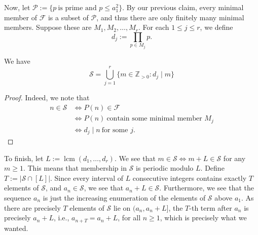 \documentclass[11pt]{article}
\begin{document}
Now, let $\mathcal{P} := \{ p \ \text{is prime and } p \le a_1^2 \}$. By our previous claim, every minimal member of $\mathcal{F}$ is a subset of $\mathcal{P}$, and thus there are only finitely many minimal members. Suppose these are $M_1, M_2, \dots, M_r$. For each $1 \le j \le r$, we define
\[ d_j := \prod_{p \in M_j} p. \]
\begin{claim}
    We have
\[ \mathcal{S} = \bigcup_{j= 1}^r \{ m \in \mathbb{Z}_{>0} : d_j \mid m \} \]
\end{claim}
\begin{proof}
    Indeed, we note that
\begin{align*}
n \in \mathcal{S} &\iff P(n) \in \mathcal{F} \\ 
&\iff P(n) \ \text{contain some minimal member } M_j \\ 
&\iff d_j \mid n \ \text{for some } j.
\end{align*}
\end{proof}

To finish, let $L := \operatorname{lcm}(d_1, \dots, d_r)$. We see that $m \in \mathcal{S} \iff m + L \in \mathcal{S}$ for any $m \ge 1$. This means that membership in $\mathcal{S}$ is periodic modulo $L$. Define $T := |\mathcal{S} \cap [L]|$. Since every interval of $L$ consecutive integers contains exactly $T$ elements of $\mathcal{S}$, and $a_n \in \mathcal{S}$, we see that $a_n + L \in \mathcal{S}$. Furthermore, we see that the sequence $a_n$ is just the increasing enumeration of the elements of $\mathcal{S}$ above $a_1$. As there are precisely $T$ elements of $\mathcal{S}$ lie on $(a_n, a_n + L]$, the $T$-th term after $a_n$ is precisely $a_n + L$, i.e., $a_{n + T} = a_n + L$, for all $n \ge 1$, which is precisely what we wanted.
\newpage
\end{document}
